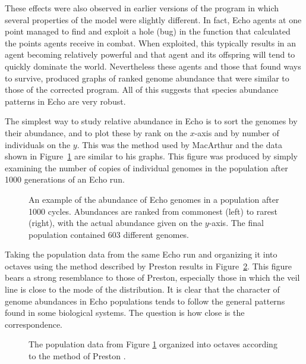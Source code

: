 These effects were also observed in earlier versions of the program in
which several properties of the model were slightly different.  In
fact, Echo agents at one point managed to find and exploit a hole
(bug) in the function that calculated the points agents receive in
combat. When exploited, this typically results in an agent becoming
relatively powerful and that agent and its offspring will tend to
quickly dominate the world. Nevertheless these agents and those that
found ways to survive, produced graphs of ranked genome abundance that
were similar to those of the corrected program.  All of this suggests
that species abundance patterns in Echo are very robust.  

The simplest way to study relative abundance in Echo is to sort the
genomes by their abundance, and to plot these by rank on the $x$-axis
and by number of individuals on the $y$. This was the method used by
MacArthur \cite{MacArthur57,MacArthur60} and the data shown in
Figure~\ref{fig:ranked-genome-frequencies} are similar to his
graphs. This figure was produced by simply examining the number of
copies of individual genomes in the population after 1000 generations
of an Echo run.

\begin{figure}
\begin{center}
\leavevmode
\epsfysize=3in
\caption{An example of the abundance of Echo genomes in a population
after 1000 cycles. Abundances are ranked from commonest (left) to
rarest (right), with the actual abundance given on the $y$-axis.
The final population contained 603 different genomes.
\label{fig:ranked-genome-frequencies}}
\end{center}
\end{figure}

Taking the population data from the same Echo run and organizing it
into octaves using the method described by Preston \cite{Preston48}
results in Figure~\ref{fig:ungrouped-prestonized}.  This figure bears
a strong resemblance to those of Preston, especially those in which
the veil line is close to the mode of the distribution.  It is clear
that the character of genome abundances in Echo populations tends to
follow the general patterns found in some biological systems. The
question is how close is the correspondence.

\begin{figure}
\begin{center}
\leavevmode
\epsfysize=3in
\caption[hey]{The population data from Figure
\ref{fig:ranked-genome-frequencies} organized into octaves according
to the method of Preston \cite{Preston48}.
\label{fig:ungrouped-prestonized}}
\end{center}
\end{figure}

